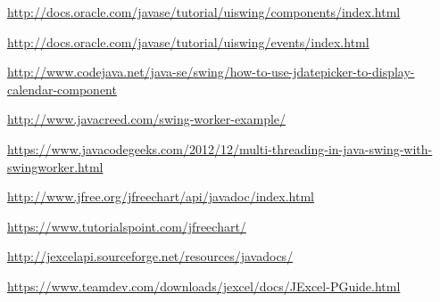 \documentclass[12pt, a4paper]{book}
\begin{document}
\begin{thebibliography}{10}
	\bibitem[Oracle]{}
	\newline
	\href{http://docs.oracle.com/javase/tutorial/uiswing/components/index.html}{http://docs.oracle.com/javase/tutorial/uiswing/components/index.html}
	
	\bibitem[Oracle]{}
	\newline
	\href{http://docs.oracle.com/javase/tutorial/uiswing/events/index.html}{http://docs.oracle.com/javase/tutorial/uiswing/events/index.html}
	
	\bibitem[CodeJava]{}
	\newline
	\href{http://www.codejava.net/java-se/swing/how-to-use-jdatepicker-to-display-calendar-component}{http://www.codejava.net/java-se/swing/how-to-use-jdatepicker-to-display-calendar-component}
	
	\newline
	\href{http://www.javacreed.com/swing-worker-example/}{http://www.javacreed.com/swing-worker-example/}
	
	\newline
	\href{https://www.javacodegeeks.com/2012/12/multi-threading-in-java-swing-with-swingworker.html}{https://www.javacodegeeks.com/2012/12/multi-threading-in-java-swing-with-swingworker.html}
	
	\bibitem[jfree]{}
	\newline
	\href{http://www.jfree.org/jfreechart/api/javadoc/index.html}{http://www.jfree.org/jfreechart/api/javadoc/index.html}
	
	\newline
	\href{https://www.tutorialspoint.com/jfreechart/}{https://www.tutorialspoint.com/jfreechart/}
	
	\bibitem[jexcelapi]{}
	\newline
	\href{http://jexcelapi.sourceforge.net/resources/javadocs/}{http://jexcelapi.sourceforge.net/resources/javadocs/}
	
	
	\bibitem[TeamDev]{}
	\newline
	\href{https://www.teamdev.com/downloads/jexcel/docs/JExcel-PGuide.html}{https://www.teamdev.com/downloads/jexcel/docs/JExcel-PGuide.html}
	
	
\end{thebibliography}
\newpage
{}
\printglossary[type=\acronymtype]
\end{document}
